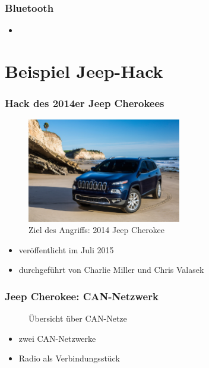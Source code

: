 \documentclass[t]{beamer}
\begin{document}
\begin{frame}
	\frametitle{Bluetooth}
    \begin{itemize}
		\item
    \end{itemize}
\end{frame}

\section{Beispiel Jeep-Hack}
\begin{frame}
	\frametitle{Hack des 2014er Jeep Cherokees}
	\begin{figure}
        \includegraphics[width=0.6\textwidth]{pic/2014-jeep-cherokee-1.jpg} %
        \caption{Ziel des Angriffs: 2014 Jeep Cherokee}
    \end{figure}
    \begin{itemize}
		\item veröffentlicht im Juli 2015
        \item durchgeführt von Charlie Miller und Chris Valasek
	\end{itemize}
\end{frame}

\begin{frame}
	\frametitle{Jeep Cherokee: CAN-Netzwerk}
    \begin{figure}
        \caption{Übersicht über CAN-Netze}
	\end{figure}
    \begin{itemize}
		\item zwei CAN-Netzwerke
        \item Radio als Verbindungsstück
	\end{itemize}
\end{frame}
\end{document}

